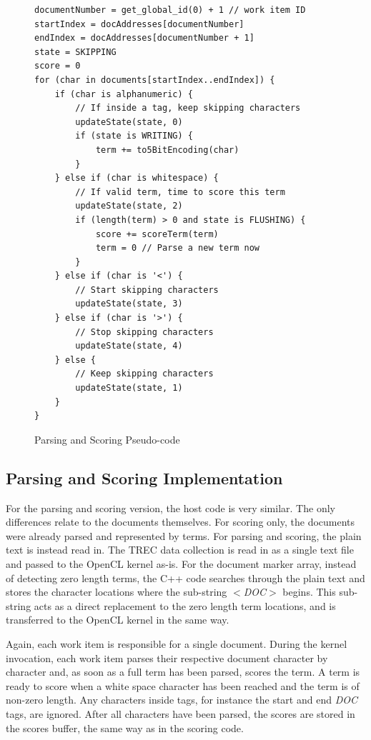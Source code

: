 \begin{figure}[H]
\small\begin{verbatim}
documentNumber = get_global_id(0) + 1 // work item ID
startIndex = docAddresses[documentNumber]
endIndex = docAddresses[documentNumber + 1]
state = SKIPPING
score = 0
for (char in documents[startIndex..endIndex]) {
    if (char is alphanumeric) {
        // If inside a tag, keep skipping characters
        updateState(state, 0)
        if (state is WRITING) {
            term += to5BitEncoding(char)
        }
    } else if (char is whitespace) {
        // If valid term, time to score this term
        updateState(state, 2)
        if (length(term) > 0 and state is FLUSHING) {
            score += scoreTerm(term)
            term = 0 // Parse a new term now
        }
    } else if (char is '<') {
        // Start skipping characters
        updateState(state, 3)
    } else if (char is '>') {
        // Stop skipping characters
        updateState(state, 4)
    } else {
        // Keep skipping characters
        updateState(state, 1)
    }
}
\end{verbatim}
\caption{Parsing and Scoring Pseudo-code}
\label{fig:parsingScoringPseudocode}
\end{figure}

\subsection{Parsing and Scoring Implementation}

For the parsing and scoring version, the host code is very similar. The only
differences relate to the documents themselves. For scoring only, the documents
were already parsed and represented by terms. For parsing and scoring, the plain
text is instead read in. The TREC data collection is read in as a single text
file and passed to the OpenCL kernel as-is. For the document marker array,
instead of detecting zero length terms, the C++ code searches through the plain
text and stores the character locations where the sub-string \emph{$<$DOC$>$}
begins. This sub-string acts as a direct replacement to the zero length term
locations, and is transferred to the OpenCL kernel in the same way.

Again, each work item is responsible for a single document. During the kernel
invocation, each work item parses their respective document character by
character and, as soon as a full term has been parsed, scores the term. A term
is ready to score when a white space character has been reached and the term is
of non-zero length. Any characters inside tags, for instance the start and end
\emph{DOC} tags, are ignored. After all characters have been parsed, the scores
are stored in the scores buffer, the same way as in the scoring code.

